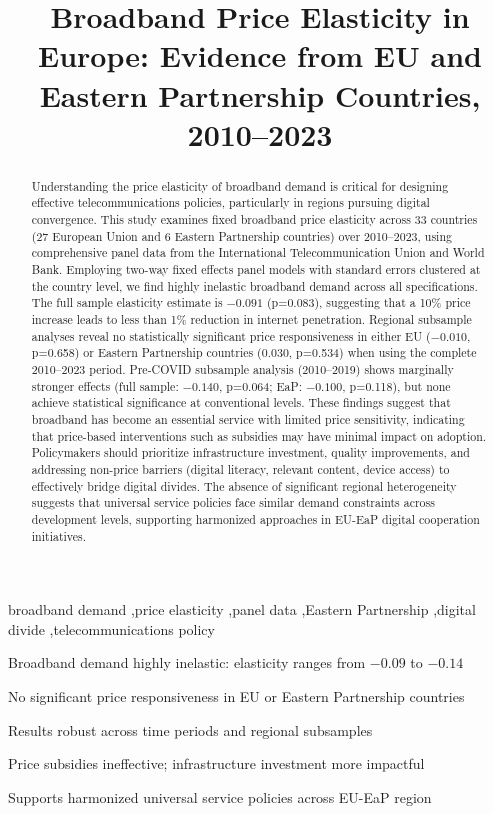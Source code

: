 \documentclass[12pt,review]{elsarticle}
\begin{document}
\begin{frontmatter}

\title{Broadband Price Elasticity in Europe: Evidence from EU and Eastern Partnership Countries, 2010--2023}

\begin{abstract}
Understanding the price elasticity of broadband demand is critical for designing effective telecommunications policies, particularly in regions pursuing digital convergence. This study examines fixed broadband price elasticity across 33 countries (27 European Union and 6 Eastern Partnership countries) over 2010--2023, using comprehensive panel data from the International Telecommunication Union and World Bank. Employing two-way fixed effects panel models with standard errors clustered at the country level, we find highly inelastic broadband demand across all specifications. The full sample elasticity estimate is $-0.091$ (p=0.083), suggesting that a 10\% price increase leads to less than 1\% reduction in internet penetration. Regional subsample analyses reveal no statistically significant price responsiveness in either EU ($-0.010$, p=0.658) or Eastern Partnership countries ($0.030$, p=0.534) when using the complete 2010--2023 period. Pre-COVID subsample analysis (2010--2019) shows marginally stronger effects (full sample: $-0.140$, p=0.064; EaP: $-0.100$, p=0.118), but none achieve statistical significance at conventional levels. These findings suggest that broadband has become an essential service with limited price sensitivity, indicating that price-based interventions such as subsidies may have minimal impact on adoption. Policymakers should prioritize infrastructure investment, quality improvements, and addressing non-price barriers (digital literacy, relevant content, device access) to effectively bridge digital divides. The absence of significant regional heterogeneity suggests that universal service policies face similar demand constraints across development levels, supporting harmonized approaches in EU-EaP digital cooperation initiatives.
\end{abstract}

\begin{keyword}
broadband demand \sep price elasticity \sep panel data \sep Eastern Partnership \sep digital divide \sep telecommunications policy
\end{keyword}

\begin{highlights}
\item Broadband demand highly inelastic: elasticity ranges from $-0.09$ to $-0.14$
\item No significant price responsiveness in EU or Eastern Partnership countries
\item Results robust across time periods and regional subsamples
\item Price subsidies ineffective; infrastructure investment more impactful
\item Supports harmonized universal service policies across EU-EaP region
\end{highlights}

\end{frontmatter}
\end{document}
